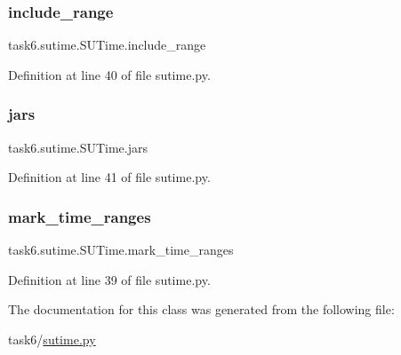 \subsubsection{\texorpdfstring{include\+\_\+range}{include\_range}}
{\footnotesize\ttfamily task6.\+sutime.\+S\+U\+Time.\+include\+\_\+range}



Definition at line 40 of file sutime.\+py.

\mbox{\label{classtask6_1_1sutime_1_1SUTime_aee86d05dd182246589b8f0eb6ea16897}} 
\subsubsection{\texorpdfstring{jars}{jars}}
{\footnotesize\ttfamily task6.\+sutime.\+S\+U\+Time.\+jars}



Definition at line 41 of file sutime.\+py.

\mbox{\label{classtask6_1_1sutime_1_1SUTime_a406b3a84a46ccab63a3b514e475d998e}} 
\subsubsection{\texorpdfstring{mark\+\_\+time\+\_\+ranges}{mark\_time\_ranges}}
{\footnotesize\ttfamily task6.\+sutime.\+S\+U\+Time.\+mark\+\_\+time\+\_\+ranges}



Definition at line 39 of file sutime.\+py.



The documentation for this class was generated from the following file\+:\begin{DoxyCompactItemize}
\item 
task6/\hyperlink{sutime_8py}{sutime.\+py}\end{DoxyCompactItemize}
